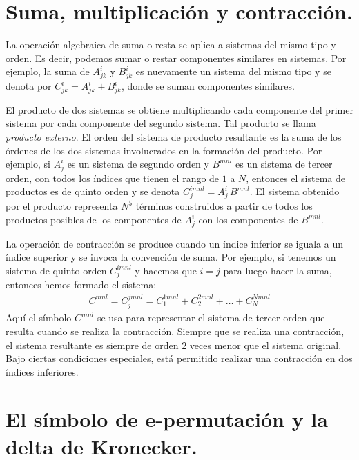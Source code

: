 \documentclass[hidelinks,12pt]{article}
\begin{document}
\section{Suma, multiplicación y contracción.}

La operación algebraica de suma o resta se aplica a sistemas del mismo tipo y orden. Es decir, podemos sumar o restar componentes similares en sistemas. Por ejemplo, la suma de $A_{jk}^{i}$ y $B_{jk}^{i}$ es nuevamente un sistema del mismo tipo y se denota por $C_{jk}^{i} = A_{jk}^{i} + B_{jk}^{i}$, donde se suman componentes similares.
\par
El producto de dos sistemas se obtiene multiplicando cada componente del primer sistema por cada componente del segundo sistema. Tal producto se llama \emph{producto externo}. El orden del sistema de producto resultante es la suma de los órdenes de los dos sistemas involucrados en la formación del producto. Por ejemplo, si $A_{j}^{i}$ es un sistema de segundo orden y $B^{mnl}$ es un sistema de tercer orden, con todos los índices que tienen el rango de $1$ a $N$, entonces el sistema de productos es de quinto orden y se denota $C_{j}^{imnl} = A_{j}^{i} \, B^{mnl}$. El sistema obtenido por el producto representa $N^{5}$ términos construidos a partir de todos los productos posibles de los componentes de $A_{j}^{i}$ con los componentes de $B^{mnl}$.
\par
La operación de contracción se produce cuando un índice inferior se iguala a un índice superior y se invoca la convención de suma. Por ejemplo, si tenemos un sistema de quinto orden $C_{j}^{imnl}$ y hacemos que $i = j$ para luego hacer la suma, entonces hemos formado el sistema:
\begin{align*}
C^{mnl} = C_{j}^{jmnl} = C_{1}^{1mnl} + C_{2}^{2mnl} + \ldots + C_{N}^{Nmnl}
\end{align*}
Aquí el símbolo $C^{mnl}$ se usa para representar el sistema de tercer orden que resulta cuando se realiza la contracción. Siempre que se realiza una contracción, el sistema resultante es siempre de orden $2$ veces menor que el sistema original. Bajo ciertas condiciones especiales, está permitido realizar una contracción en dos índices inferiores.

\section{El símbolo de e-permutación y la delta de Kronecker.}
\end{document}
